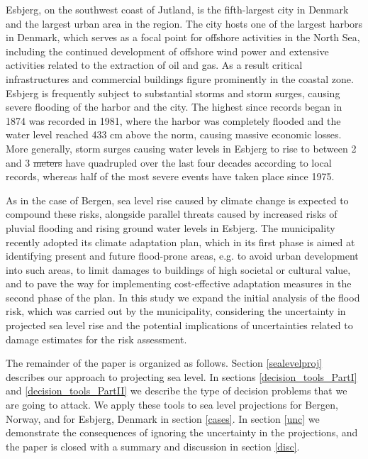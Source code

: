 \documentclass[draft,linenumbers]{agujournal}
\providecommand{\DIFadd}[1]{{\protect\color{blue}\uwave{#1}}} %
\providecommand{\DIFdel}[1]{{\protect\color{red}\sout{#1}}}                      %
\providecommand{\DIFaddbegin}{} %
\providecommand{\DIFaddend}{} %
\providecommand{\DIFdelbegin}{} %
\providecommand{\DIFdelend}{} %
\begin{document}
Esbjerg, on the southwest coast of Jutland, is the fifth-largest city in Denmark and the largest urban area in the region. The city hosts one of the largest harbors  in Denmark, which serves as a focal point for offshore activities in the North Sea, including the continued development of offshore wind power and extensive activities related to the extraction of oil and gas. As a result critical infrastructures and commercial buildings figure prominently in the coastal zone. Esbjerg is frequently subject to substantial storms and storm surges, causing severe flooding of the harbor and the city. The highest since records began in 1874 was recorded in 1981, where the harbor was completely flooded and the water level reached  433 cm above the norm, causing massive economic losses.  More generally, storm surges causing water levels in Esbjerg to rise to between 2 and 3 \DIFdelbegin \DIFdel{meters }\DIFdelend \DIFaddbegin \DIFadd{metres }\DIFaddend have quadrupled over the last four decades according to local records, whereas half of the most severe events have taken place since 1975.

As in the case of Bergen, sea level rise caused by climate change is expected to compound these risks, alongside parallel threats caused by increased risks of pluvial flooding and rising ground water levels in Esbjerg. The municipality recently adopted its climate adaptation plan, which in its first phase is aimed at identifying present and future flood-prone areas, e.g. to avoid urban development into such areas, to limit damages to buildings of high societal or cultural value, and to pave the way for implementing cost-effective adaptation measures in the second phase of the plan. In this study we expand the initial analysis of the flood risk, which was carried out by the municipality, considering the uncertainty in projected sea level rise and the potential implications of uncertainties related to damage estimates for the risk assessment.

The remainder of the paper is organized as follows. Section \ref{sealevelproj} describes our approach to projecting sea level. In sections \ref{decision_tools_PartI} and \ref{decision_tools_PartII} we describe the type of decision problems that we are going to attack. We apply these tools to sea level projections for Bergen, Norway, and for Esbjerg, Denmark in section \ref{cases}. In section \ref{unc} we demonstrate the consequences of ignoring the uncertainty in the projections, and the paper is closed with a summary and discussion in section \ref{disc}.
\end{document}
